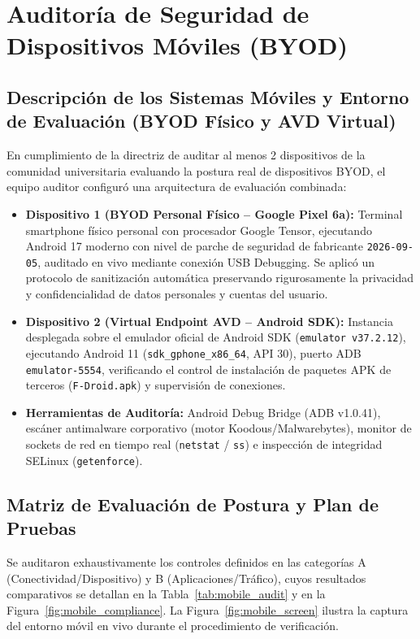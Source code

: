 \documentclass[11pt,a4paper]{article}
\begin{document}
\section{Auditoría de Seguridad de Dispositivos Móviles (BYOD)}

\subsection{Descripción de los Sistemas Móviles y Entorno de Evaluación (BYOD Físico y AVD Virtual)}
En cumplimiento de la directriz de auditar al menos 2 dispositivos de la comunidad universitaria evaluando la postura real de dispositivos BYOD, el equipo auditor configuró una arquitectura de evaluación combinada:
\begin{itemize}[noitemsep]
    \item \textbf{Dispositivo 1 (BYOD Personal Físico -- Google Pixel 6a):} Terminal smartphone físico personal con procesador Google Tensor, ejecutando Android 17 moderno con nivel de parche de seguridad de fabricante \texttt{2026-09-05}, auditado en vivo mediante conexión USB Debugging. Se aplicó un protocolo de sanitización automática preservando rigurosamente la privacidad y confidencialidad de datos personales y cuentas del usuario.
    \item \textbf{Dispositivo 2 (Virtual Endpoint AVD -- Android SDK):} Instancia desplegada sobre el emulador oficial de Android SDK (\texttt{emulator v37.2.12}), ejecutando Android 11 (\texttt{sdk\_gphone\_x86\_64}, API 30), puerto ADB \texttt{emulator-5554}, verificando el control de instalación de paquetes APK de terceros (\texttt{F-Droid.apk}) y supervisión de conexiones.
    \item \textbf{Herramientas de Auditoría:} Android Debug Bridge (ADB v1.0.41), escáner antimalware corporativo (motor Koodous/Malwarebytes), monitor de sockets de red en tiempo real (\texttt{netstat} / \texttt{ss}) e inspección de integridad SELinux (\texttt{getenforce}).
\end{itemize}

\subsection{Matriz de Evaluación de Postura y Plan de Pruebas}
Se auditaron exhaustivamente los controles definidos en las categorías A (Conectividad/Dispositivo) y B (Aplicaciones/Tráfico), cuyos resultados comparativos se detallan en la Tabla~\ref{tab:mobile_audit} y en la Figura~\ref{fig:mobile_compliance}. La Figura~\ref{fig:mobile_screen} ilustra la captura del entorno móvil en vivo durante el procedimiento de verificación.
\end{document}
